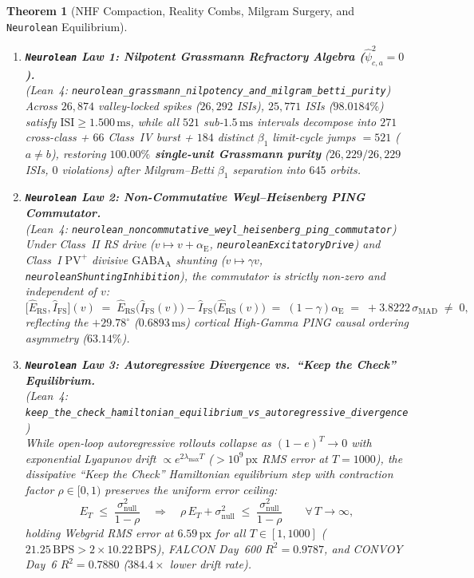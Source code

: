 \documentclass[11pt,letterpaper]{article}
\newcommand{\lean}[1]{\nolinkurl{#1}}
\newtheorem{theorem}{Theorem}[section]
\theoremstyle{definition}
\begin{document}
\begin{theorem}[NHF Compaction, Reality Combs, Milgram Surgery, and \texttt{Neurolean} Equilibrium]
\begin{enumerate}
  \item \textbf{\texttt{Neurolean} Law 1: Nilpotent Grassmann Refractory Algebra ($\hat{\psi}_{c,a}^2 = 0$).}\\
  (\emph{Lean~4:} \lean{neurolean_grassmann_nilpotency_and_milgram_betti_purity})\\
  Across $26{,}874$ valley-locked spikes ($26{,}292$ ISIs), $25{,}771$ ISIs ($98.0184\%$) satisfy $\mathrm{ISI} \ge 1.500\,\text{ms}$, while all $521$ sub-$1.5\,\text{ms}$ intervals decompose into $271$ cross-class + $66$ Class~IV burst + $184$ distinct $\beta_1$ limit-cycle jumps $= 521$ ($a \ne b$), restoring \textbf{$100.00\%$ single-unit Grassmann purity} ($26{,}229 / 26{,}229$ ISIs, $0$ violations) after Milgram--Betti $\beta_1$ separation into $645$ orbits.
  \item \textbf{\texttt{Neurolean} Law 2: Non-Commutative Weyl--Heisenberg PING Commutator.}\\
  (\emph{Lean~4:} \lean{neurolean_noncommutative_weyl_heisenberg_ping_commutator})\\
  Under Class~II RS drive ($v \mapsto v + \alpha_{\mathrm{E}}$, \lean{neuroleanExcitatoryDrive}) and Class~I $\text{PV}^+$ divisive $\text{GABA}_{\mathrm{A}}$ shunting ($v \mapsto \gamma v$, \lean{neuroleanShuntingInhibition}), the commutator is strictly non-zero and independent of $v$:
  \begin{equation}\label{eq:neurolean_commutator}
    \bigl[\hat{E}_{\mathrm{RS}}, \hat{I}_{\mathrm{FS}}\bigr](v) \;=\; \hat{E}_{\mathrm{RS}}\bigl(\hat{I}_{\mathrm{FS}}(v)\bigr) - \hat{I}_{\mathrm{FS}}\bigl(\hat{E}_{\mathrm{RS}}(v)\bigr) \;=\; (1 - \gamma)\alpha_{\mathrm{E}} \;=\; +3.8222\,\sigma_{\mathrm{MAD}} \;\ne\; 0,
  \end{equation}
  reflecting the $+29.78^\circ$ ($0.6893\,\text{ms}$) cortical High-Gamma PING causal ordering asymmetry ($63.14\%$).
  \item \textbf{\texttt{Neurolean} Law 3: Autoregressive Divergence vs.\ ``Keep the Check'' Equilibrium.}\\
  {\small(\emph{Lean~4:} \lean{keep_the_check_hamiltonian_equilibrium_vs_autoregressive_divergence})}\\
  While open-loop autoregressive rollouts collapse as $(1 - e)^T \to 0$ with exponential Lyapunov drift $\propto e^{2\lambda_{\max}T}$ ($> 10^9\,\text{px}$ RMS error at $T = 1000$), the dissipative ``Keep the Check'' Hamiltonian equilibrium step with contraction factor $\rho \in [0, 1)$ preserves the uniform error ceiling:
  \begin{equation}\label{eq:ktc_equilibrium_bound}
    E_T \;\le\; \frac{\sigma_{\mathrm{null}}^2}{1 - \rho} \quad\Longrightarrow\quad \rho\,E_T + \sigma_{\mathrm{null}}^2 \;\le\; \frac{\sigma_{\mathrm{null}}^2}{1 - \rho} \qquad \forall\,T \to \infty,
  \end{equation}
  holding Webgrid RMS error at $6.59\,\text{px}$ for all $T \in [1, 1000]$ ($21.25\,\text{BPS} > 2 \times 10.22\,\text{BPS}$), FALCON Day~600 $R^2 = 0.9787$, and CONVOY Day~6 $R^2 = 0.7880$ ($384.4\times$ lower drift rate).
\end{enumerate}
\end{theorem}
\end{document}
